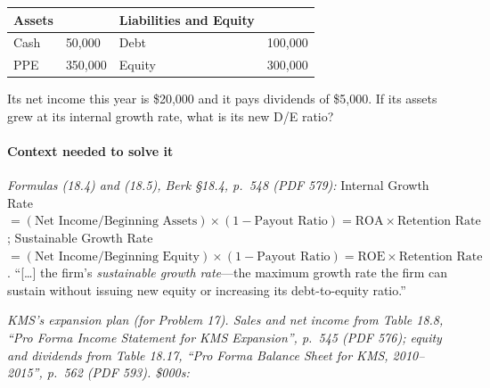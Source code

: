 \documentclass[11pt,a4paper]{article}
\begin{document}
{\def\LTcaptype{none} %
\begin{longtable}[]{@{}llll@{}}
\toprule\noalign{}
Assets & & Liabilities and Equity & \\
\midrule\noalign{}
\endhead
\bottomrule\noalign{}
\endlastfoot
Cash & 50,000 & Debt & 100,000 \\
PPE & 350,000 & Equity & 300,000 \\
\end{longtable}
}

Its net income this year is \$20,000 and it pays dividends of \$5,000. If its assets grew at its
internal growth rate, what is its new D/E ratio?

\paragraph{Context needed to solve it}

\emph{Formulas (18.4) and (18.5), Berk §18.4, p.~548 (PDF 579):} Internal Growth Rate
\(= (\text{Net Income}/\text{Beginning Assets}) \times (1 - \text{Payout Ratio}) = \text{ROA} \times \text{Retention Rate}\);
Sustainable Growth Rate
\(= (\text{Net Income}/\text{Beginning Equity}) \times (1 - \text{Payout Ratio}) = \text{ROE} \times \text{Retention Rate}\).
``{[}\ldots{]} the firm's \emph{sustainable growth rate}---the maximum growth rate the firm can
sustain without issuing new equity or increasing its debt-to-equity ratio.''

\emph{KMS's expansion plan (for Problem 17). Sales and net income from Table 18.8, ``Pro Forma
Income Statement for KMS Expansion'', p.~545 (PDF 576); equity and dividends from Table 18.17, ``Pro
Forma Balance Sheet for KMS, 2010--2015'', p.~562 (PDF 593). \$000s:}
\end{document}
